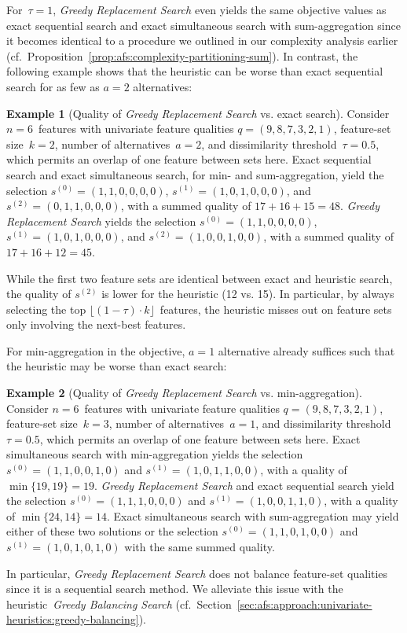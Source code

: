 \documentclass{article}
\theoremstyle{definition}
\newtheorem{example}{Example}
\begin{document}
%
For~$\tau = 1$, \emph{Greedy Replacement Search} even yields the same objective values as exact sequential search and exact simultaneous search with sum-aggregation since it becomes identical to a procedure we outlined in our complexity analysis earlier (cf.~Proposition~\ref{prop:afs:complexity-partitioning-sum}).
In contrast, the following example shows that the heuristic can be worse than exact sequential search for as few as $a=2$ alternatives:
%
\begin{example}[Quality of \emph{Greedy Replacement Search} vs. exact search]
	Consider $n=6$~features with univariate feature qualities $q = (9,8,7,3,2,1)$, feature-set size~$k=2$, number of alternatives~$a=2$, and dissimilarity threshold~$\tau = 0.5$, which permits an overlap of one feature between sets here.
	Exact sequential search and exact simultaneous search, for min- and sum-aggregation, yield the selection $s^{(0)} = (1,1,0,0,0,0)$, $s^{(1)} = (1,0,1,0,0,0)$, and $s^{(2)} = (0,1,1,0,0,0)$, with a summed quality of $17+16+15=48$.
	\emph{Greedy Replacement Search} yields the selection $s^{(0)} = (1,1,0,0,0,0)$, $s^{(1)} = (1,0,1,0,0,0)$, and $s^{(2)} = (1,0,0,1,0,0)$, with a summed quality of $17+16+12=45$.
	\label{ex:afs:greedy-replacement:worse-than-exact}
\end{example}
%
While the first two feature sets are identical between exact and heuristic search, the quality of $s^{(2)}$ is lower for the heuristic (12 vs. 15).
In particular, by always selecting the top $\lfloor (1 - \tau) \cdot k \rfloor$~features, the heuristic misses out on feature sets only involving the next-best features.

For min-aggregation in the objective, $a=1$ alternative already suffices such that the heuristic may be worse than exact search:
%
\begin{example}[Quality of \emph{Greedy Replacement Search} vs. min-aggregation]
	Consider $n=6$~features with univariate feature qualities $q = (9,8,7,3,2,1)$, feature-set size~$k=3$, number of alternatives~$a=1$, and dissimilarity threshold~$\tau = 0.5$, which permits an overlap of one feature between sets here.
	Exact simultaneous search with min-aggregation yields the selection $s^{(0)} = (1,1,0,0,1,0)$ and $s^{(1)} = (1,0,1,1,0,0)$, with a quality of $\min \{19,19\} = 19$.
	\emph{Greedy Replacement Search} and exact sequential search yield the selection $s^{(0)} = (1,1,1,0,0,0)$ and $s^{(1)} = (1,0,0,1,1,0)$, with a quality of $\min \{24,14\} = 14$.
	Exact simultaneous search with sum-aggregation may yield either of these two solutions or the selection $s^{(0)} = (1,1,0,1,0,0)$ and $s^{(1)} = (1,0,1,0,1,0)$ with the same summed quality.
	\label{ex:afs:greedy-replacement:worse-than-min-agg}
\end{example}
%
In particular, \emph{Greedy Replacement Search} does not balance feature-set qualities since it is a sequential search method.
We alleviate this issue with the heuristic~\emph{Greedy Balancing Search} (cf.~Section~\ref{sec:afs:approach:univariate-heuristics:greedy-balancing}).
\end{document}
